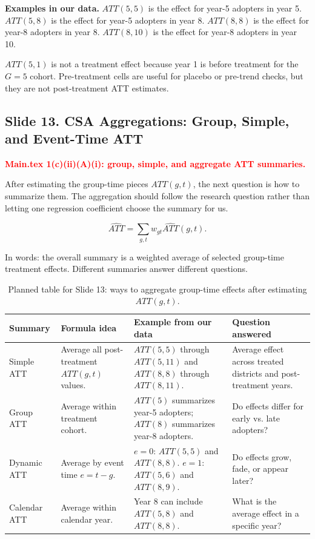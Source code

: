 \documentclass[11pt]{article}
\newcommand{\slideheading}[2]{%
  \subsection*{Slide #1. #2}
}
\newcommand{\slidecontent}[1]{#1}
\newcommand{\mainpoint}[1]{%
  \slidecontent{\textcolor{red}{\textbf{Main.tex #1}}}
}
\begin{document}
\slidecontent{\textbf{Examples in our data.} $ATT(5,5)$ is the effect for
year-5 adopters in year 5. $ATT(5,8)$ is the effect for year-5 adopters in
year 8. $ATT(8,8)$ is the effect for year-8 adopters in year 8. $ATT(8,10)$ is
the effect for year-8 adopters in year 10.}

\slidecontent{$ATT(5,1)$ is not a treatment effect because year 1 is before
treatment for the $G=5$ cohort. Pre-treatment cells are useful for placebo or
pre-trend checks, but they are not post-treatment ATT estimates.}

\slideheading{13}{CSA Aggregations: Group, Simple, and Event-Time ATT}
\mainpoint{1(c)(ii)(A)(i): group, simple, and aggregate ATT summaries.}

\slidecontent{After estimating the group-time pieces $ATT(g,t)$, the next
question is how to summarize them. The aggregation should follow the research
question rather than letting one regression coefficient choose the summary for
us.}

\[
\widehat{ATT}
=
\sum_{g,t} w_{gt}\widehat{ATT}(g,t).
\]

\slidecontent{In words: the overall summary is a weighted average of selected
group-time treatment effects. Different summaries answer different questions.}

\begin{table}[H]
\centering
\scriptsize
\begin{tabular}{@{}L{0.15\textwidth}L{0.23\textwidth}L{0.31\textwidth}L{0.18\textwidth}@{}}
\toprule
\textbf{Summary} & \textbf{Formula idea} & \textbf{Example from our data} & \textbf{Question answered} \\
\midrule
Simple ATT & Average all post-treatment $ATT(g,t)$ values. &
$ATT(5,5)$ through $ATT(5,11)$ and $ATT(8,8)$ through $ATT(8,11)$. &
Average effect across treated districts and post-treatment years. \\
Group ATT & Average within treatment cohort. &
$ATT(5)$ summarizes year-5 adopters; $ATT(8)$ summarizes year-8 adopters. &
Do effects differ for early vs. late adopters? \\
Dynamic ATT & Average by event time $e=t-g$. &
$e=0$: $ATT(5,5)$ and $ATT(8,8)$. $e=1$: $ATT(5,6)$ and $ATT(8,9)$. &
Do effects grow, fade, or appear later? \\
Calendar ATT & Average within calendar year. &
Year 8 can include $ATT(5,8)$ and $ATT(8,8)$. &
What is the average effect in a specific year? \\
\bottomrule
\end{tabular}
\caption*{\footnotesize Planned table for Slide 13: ways to aggregate group-time effects after estimating $ATT(g,t)$.}
\end{table}
\end{document}
